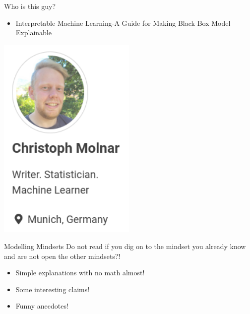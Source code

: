 \documentclass[aspectratio=169]{beamer}
\begin{document}
\begin{frame}{Who is this guy?}
\begin{minipage}{0.5\textwidth}
  \begin{itemize}
    \item Interpretable Machine Learning-A Guide for Making Black Box Model Explainable
  \end{itemize}
\end{minipage}%
\begin{minipage}{0.5\textwidth}
  \centering
  \includegraphics[width=0.5\textwidth]{figures/molnar.png}
\end{minipage}
\end{frame}

\begin{frame}{Modelling Mindsets}
  \color{Pink} Do not read if you dig on to the mindset you already know and are not open the other mindsets?! \color{Black}
  \begin{itemize}
    \item <1> Simple explanations with no math almost! 
    \item <2> Some interesting claims!
    \item <3> Funny anecdotes!
  \end{itemize}
\end{frame}
\end{document}
